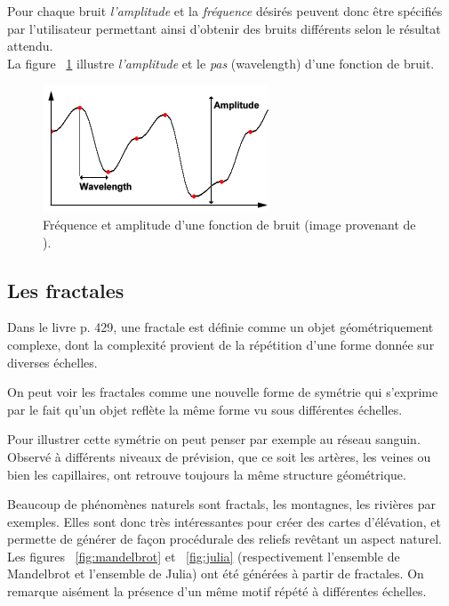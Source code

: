  Pour chaque bruit \emph{l'amplitude} et la \emph{fréquence} désirés
peuvent donc être spécifiés par l'utilisateur permettant ainsi d'obtenir des
bruits différents selon le résultat attendu.\\

La figure ~\ref{fig:noise-freq-ampl} illustre \emph{l'amplitude} et le \emph{pas}
(wavelength) d'une fonction de bruit.\\

\begin{figure}[ht]
  \centering
  \includegraphics{resources/noise-freq-ampl.png}
  \caption{Fréquence et amplitude d'une fonction de bruit (image provenant de
    \cite{PerlinWeb}).}
  \label{fig:noise-freq-ampl}
\end{figure}


\subsection{Les fractales}
Dans le livre \cite{Eber02} p. 429, une fractale est définie comme un objet
géométriquement complexe, dont la complexité provient de la répétition
d'une forme donnée sur diverses échelles.

On peut voir les fractales comme une nouvelle forme de symétrie qui
s'exprime par le fait qu'un objet reflète la même forme vu sous
différentes échelles.

Pour illustrer cette symétrie on peut penser par exemple au réseau sanguin.
Observé à différents niveaux de prévision, que ce soit les artères, les veines
ou bien les capillaires, ont retrouve toujours la même structure géométrique.

Beaucoup de phénomènes naturels sont fractals, les montagnes, les rivières par
exemples. Elles sont donc très intéressantes pour créer des cartes d'élévation,
et permette de générer de façon procédurale des reliefs revêtant un aspect
naturel.\\

Les figures ~\ref{fig:mandelbrot} et ~\ref{fig:julia} (respectivement l'ensemble de Mandelbrot et l'ensemble de Julia)
ont été générées à partir de fractales. On remarque aisément la présence d'un
même motif répété à différentes échelles.\\

